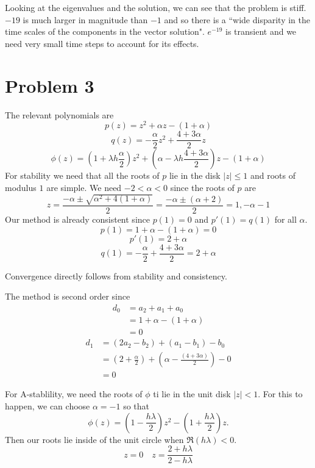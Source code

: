 \documentclass{article}
\begin{document}
Looking at the eigenvalues and the solution,
we can see that the problem is stiff.
$-19$ is much larger in magnitude than $-1$ and so there is a 
``wide disparity in the time scales of the components in the vector solution".
$e^{-19}$ is transient and we need very small time steps to account for its effects.
\newpage 

\section*{Problem 3}
The relevant polynomials are
\[
	p(z) = z^2 + \alpha z - (1+\alpha)
\]
\[
	q(z) = - \frac{\alpha}{2}z^2 + \frac{4+3\alpha}{2}z
\]
\[
	\phi(z) = \left(1+\lambda h\frac{\alpha}{2}\right)z^2 + \left(\alpha - \lambda h\frac{4+3\alpha}{2}\right)z - (1+\alpha)
\]
For stability we need that all the roots of $p$ lie in the disk $|z| \leq 1$ and
roots of modulus $1$ are simple.
We need $-2 < \alpha < 0$ since the roots of $p$ are 
\[
	z = \frac{-\alpha \pm \sqrt{\alpha^2 + 4(1+\alpha)}}{2} 
	= \frac{-\alpha \pm (\alpha+2)}{2}
	= 1, -\alpha-1
\]
Our method is already consistent since $p(1) = 0$ and $p'(1) = q(1)$ for all $\alpha$.
\[
	p(1) = 1 + \alpha - (1+\alpha) = 0
\]
\[
	p'(1) = 2 + \alpha 
\]
\[
	q(1) = - \frac{\alpha}{2} + \frac{4+3\alpha}{2} = 2 + \alpha
\]

Convergence directly follows from stability and consistency. 

The method is second order since
\begin{align*}
	d_0 &= a_2 + a_1 + a_0 \\
	&= 1 + \alpha - (1+\alpha)\\
	&= 0
\end{align*}
\begin{align*}
	d_1 &= (2a_2 - b_2) + (a_1 - b_1) - b_0 \\
	&= \left(2 + \frac{\alpha}{2}\right) + \left(\alpha -\frac{(4+3\alpha)}{2}\right) - 0\\
	&= 0
\end{align*}

For A-stablility, we need the roots of $\phi$ ti
lie in the unit disk $|z| < 1$.
For this to happen, we can choose $\alpha = -1$ so that
\[
	\phi(z) = \left(1-\frac{h\lambda}{2}\right)z^2 - \left(1+\frac{h\lambda}{2}\right)z.
\]
Then our roots lie inside of the unit circle when $\Re(h\lambda) < 0$.
\[
	z=0 \quad z = \frac{2+h\lambda}{2-h\lambda}
\]
\newpage
\end{document}
